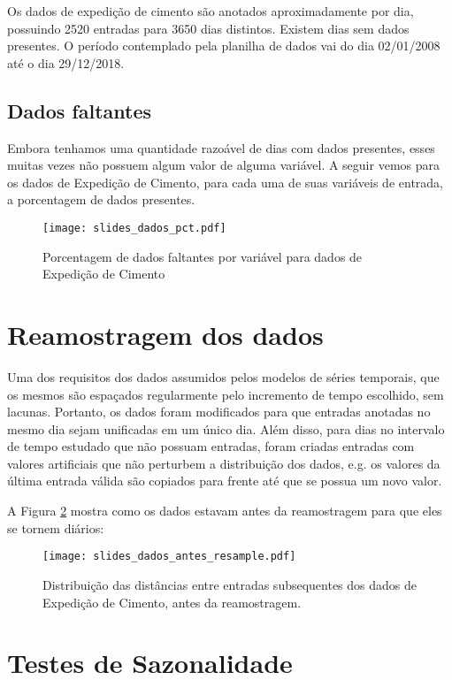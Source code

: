 Os dados de expedição de cimento são anotados aproximadamente por dia, possuindo 2520
entradas para 3650 dias distintos. Existem dias sem dados presentes. O
período contemplado pela planilha de dados vai do dia 02/01/2008 até o dia 29/12/2018.

\subsection{Dados faltantes}

Embora tenhamos uma quantidade razoável de dias com dados presentes, esses muitas vezes não possuem algum valor de alguma variável.
A seguir vemos para os dados de Expedição de Cimento, para cada uma de suas variáveis de entrada, a porcentagem de dados presentes. 


\begin{figure}[H]
  \centering
  \texttt{[image: slides\_dados\_pct.pdf]}
  \caption{Porcentagem de dados faltantes por variável para dados de Expedição de Cimento}
  \label{fig:dadosfalta}
\end{figure}


\section{Reamostragem dos dados}

Uma dos requisitos dos dados assumidos pelos modelos de séries temporais, que os mesmos
são espaçados regularmente pelo incremento de tempo escolhido, sem lacunas.
Portanto, os dados foram modificados para que entradas anotadas no mesmo dia
sejam unificadas em um único dia. Além disso, para dias no intervalo de tempo
estudado que não possuam entradas, foram criadas entradas com valores
artificiais que não perturbem a distribuição dos dados, e.g. os valores da
última entrada válida são copiados para frente até que se possua um novo valor.

A Figura \ref{fig:reamos} mostra como os dados estavam antes da reamostragem
para que eles se tornem diários: 

\begin{figure}[H]
  \centering
  \texttt{[image: slides\_dados\_antes\_resample.pdf]}
  \caption{Distribuição das distâncias entre entradas subsequentes dos dados de Expedição de Cimento, antes da reamostragem.}
  \label{fig:reamos}
\end{figure}



\section{Testes de Sazonalidade}

